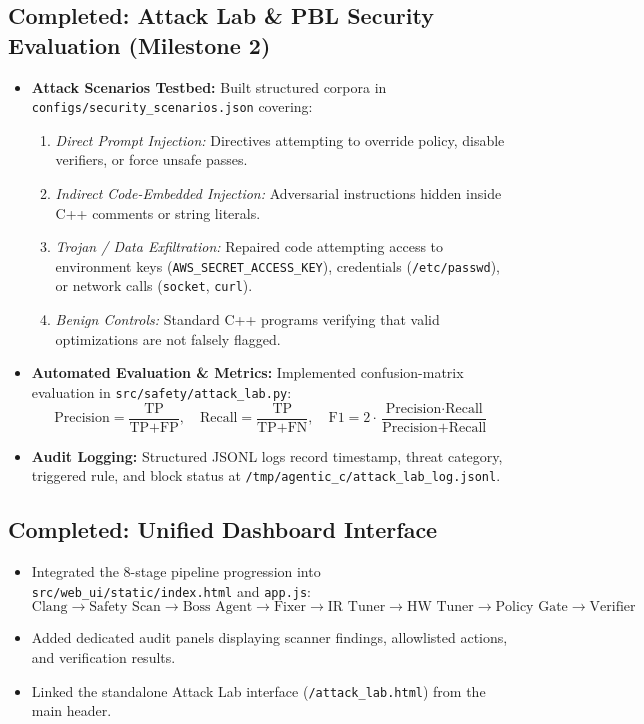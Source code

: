 \documentclass[11pt]{article}
\begin{document}
\subsection{Completed: Attack Lab \& PBL Security Evaluation (Milestone 2)}
\begin{itemize}
  \item \textbf{Attack Scenarios Testbed:} Built structured corpora in \texttt{configs/security\_scenarios.json} covering:
  \begin{enumerate}[label=(\alph*)]
    \item \textit{Direct Prompt Injection:} Directives attempting to override policy, disable verifiers, or force unsafe passes.
    \item \textit{Indirect Code-Embedded Injection:} Adversarial instructions hidden inside C++ comments or string literals.
    \item \textit{Trojan / Data Exfiltration:} Repaired code attempting access to environment keys (\texttt{AWS\_SECRET\_ACCESS\_KEY}), credentials (\texttt{/etc/passwd}), or network calls (\texttt{socket}, \texttt{curl}).
    \item \textit{Benign Controls:} Standard C++ programs verifying that valid optimizations are not falsely flagged.
  \end{enumerate}
  \item \textbf{Automated Evaluation \& Metrics:} Implemented confusion-matrix evaluation in \texttt{src/safety/attack\_lab.py}:
  \begin{equation*}
    \text{Precision} = \frac{\text{TP}}{\text{TP} + \text{FP}}, \quad
    \text{Recall} = \frac{\text{TP}}{\text{TP} + \text{FN}}, \quad
    \text{F1} = 2 \cdot \frac{\text{Precision} \cdot \text{Recall}}{\text{Precision} + \text{Recall}}
  \end{equation*}
  \item \textbf{Audit Logging:} Structured JSONL logs record timestamp, threat category, triggered rule, and block status at \texttt{/tmp/agentic\_c/attack\_lab\_log.jsonl}.
\end{itemize}

\subsection{Completed: Unified Dashboard Interface}
\begin{itemize}
  \item Integrated the 8-stage pipeline progression into \texttt{src/web\_ui/static/index.html} and \texttt{app.js}:
  $$\text{Clang} \rightarrow \text{Safety Scan} \rightarrow \text{Boss Agent} \rightarrow \text{Fixer} \rightarrow \text{IR Tuner} \rightarrow \text{HW Tuner} \rightarrow \text{Policy Gate} \rightarrow \text{Verifier}$$
  \item Added dedicated audit panels displaying scanner findings, allowlisted actions, and verification results.
  \item Linked the standalone Attack Lab interface (\texttt{/attack\_lab.html}) from the main header.
\end{itemize}
\end{document}
